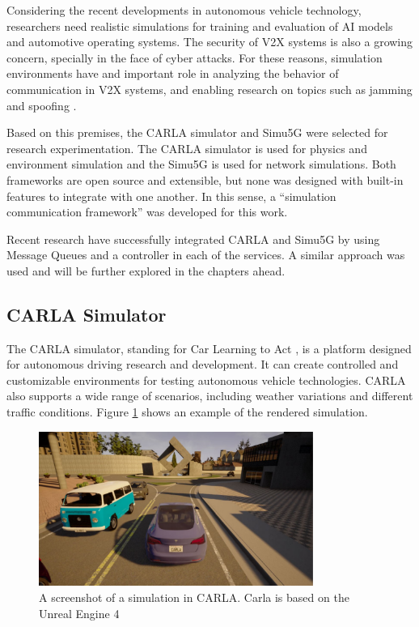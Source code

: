 Considering the recent developments in autonomous vehicle technology, researchers need realistic simulations for training and evaluation of AI models and automotive operating systems. The security of V2X systems is also a growing concern, specially in the face of cyber attacks. For these reasons, simulation environments have and important role in analyzing the behavior of communication in V2X systems, and enabling research on topics such as jamming \cite{da2023radio} and spoofing \cite{mullertechnical}. 

Based on this premises, the CARLA simulator and Simu5G were selected for research experimentation. The CARLA simulator is used for physics and environment simulation and the Simu5G is used for network simulations. Both frameworks are open source and extensible, but none was designed with built-in features to integrate with one another. In this sense, a “simulation communication framework” was developed for this work.

Recent research \cite{cislaghi2023simulation} have successfully integrated CARLA and Simu5G by using Message Queues and a controller in each of the services. A similar approach was used and will be further explored in the chapters ahead.

\subsection{CARLA Simulator} \label{carla-sim}

The CARLA simulator, standing for Car Learning to Act \cite{MALIK2022742}, is a platform designed for autonomous driving research and development. It can create controlled and customizable environments for testing autonomous vehicle technologies. CARLA also supports a wide range of scenarios, including weather variations and different traffic conditions. Figure \ref{fig:carla_screenshot} shows an example of the rendered simulation.

\begin{figure} [!ht]
    \centering
    \includegraphics[width=0.80\textwidth]{parts/figuras/carla_screenshot.pdf}
    \caption{A screenshot of a simulation in CARLA. Carla is based on the Unreal Engine 4}
    \label{fig:carla_screenshot}
\end{figure}

